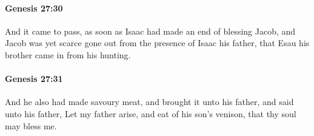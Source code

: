 		\paragraph{Genesis 27:30} %
			\label{GENESIS-27-30}

			And it came to pass, as soon as Isaac had made an end of blessing Jacob, and Jacob was yet scarce gone out from the presence of Isaac his father, that Esau his brother came in from his hunting.


		\paragraph{Genesis 27:31} %
			\label{GENESIS-27-31}

			And he also had made savoury meat, and brought it unto his father, and said unto his father, Let my father arise, and eat of his son's venison, that thy soul may bless me.



